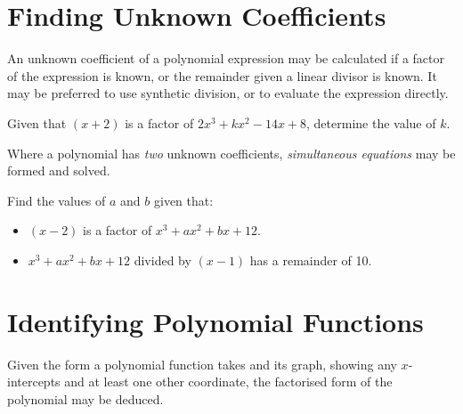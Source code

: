 \documentclass[
  11pt,
  openany]{book}
\begin{document}
\pagebreak

\section{Finding Unknown Coefficients}\label{finding-unknown-coefficients}

\vspace{-0.5cm}

An unknown coefficient of a polynomial expression may be calculated if a factor of the expression is known, or the remainder given a linear divisor is known. It may be preferred to use synthetic division, or to evaluate the expression directly.

\begin{tcolorbox}[title=Example,colback=PineGreen!2, colframe=PineGreen]

Given that $(x+2)$ is a factor of $2x^3+kx^2-14x+8$, determine the value of $k$.

\tcblower


\vspace{5cm}

\end{tcolorbox}

Where a polynomial has \textit{two} unknown coefficients, \textit{simultaneous equations} may be formed and solved.

\begin{tcolorbox}[title=Example,colback=PineGreen!2, colframe=PineGreen]

Find the values of $a$ and $b$ given that:\\
\begin{itemize}
    \item $(x-2)$ is a factor of $x^3+ax^2+bx+12$.
    \item $x^3+ax^2+bx+12$ divided by $(x-1)$ has a remainder of 10.
\end{itemize}

\tcblower



\vspace{10cm}

\end{tcolorbox}

\pagebreak

\section{Identifying Polynomial Functions}\label{identifying-polynomial-functions}

Given the form a polynomial function takes and its graph, showing any \(x\)-intercepts and at least one other coordinate, the factorised form of the polynomial may be deduced.
\end{document}
